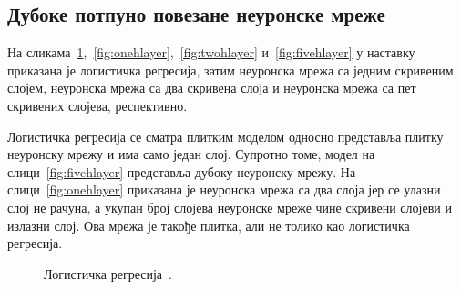 \documentclass[master]{finthesis}
\begin{document}
\subsection{Дубоке потпуно повезане неуронске мреже}

На сликама~\ref{fig:logistic:regression},~\ref{fig:onehlayer},~\ref{fig:twohlayer} и~\ref{fig:fivehlayer} у наставку приказана је логистичка регресија, затим неуронска мрежа са једним скривеним слојем, неуронска мрежа са два скривена слоја и неуронска мрежа са пет скривених слојева, респективно. 

Логистичка регресија се сматра плитким моделом односно представља плитку неуронску мрежу и има само један слој. Супротно томе, модел на слици~\ref{fig:fivehlayer} представља дубоку неуронску мрежу. На слици~\ref{fig:onehlayer} приказана је неуронска мрежа са два слоја јер се улазни слој не рачуна, а укупан број слојева неуронске мреже чине скривени слојеви и излазни слој. Ова мрежа је такође плитка, али не толико као логистичка регресија.

\vspace{6em}

\begin{figure}[htpb]
    \centering
{}
\vspace{20pt}
\caption{Логистичка регресија~\cite{cs230notes}.}
    \label{fig:logistic:regression}
\end{figure}

\setlength{\floatsep}{50pt}
\end{document}
